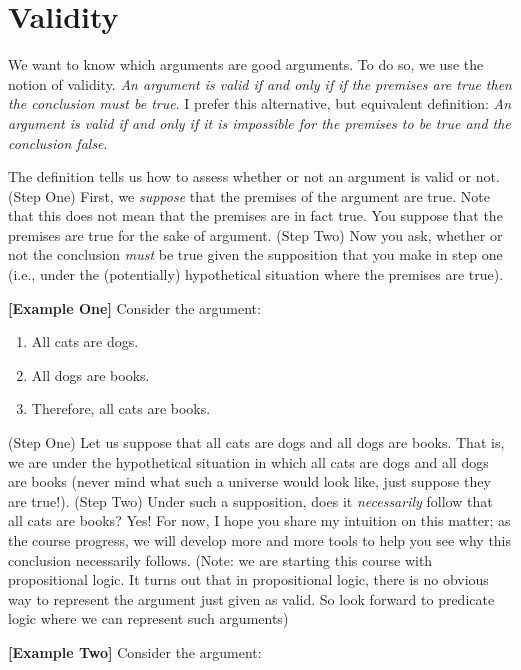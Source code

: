 \documentclass[
]{book}
\providecommand{\tightlist}{%
  \setlength{\itemsep}{0pt}\setlength{\parskip}{0pt}}
\begin{document}
\hypertarget{validity}{%
\section{Validity}\label{validity}}

We want to know which arguments are good arguments. To do so, we use the notion of validity. \emph{An argument is valid if and only if if the premises are true then the conclusion must be true}. I prefer this alternative, but equivalent definition: \emph{An argument is valid if and only if it is impossible for the premises to be true and the conclusion false}.

The definition tells us how to assess whether or not an argument is valid or not. (Step One) First, we \emph{suppose} that the premises of the argument are true. Note that this does not mean that the premises are in fact true. You suppose that the premises are true for the sake of argument. (Step Two) Now you ask, whether or not the conclusion \emph{must} be true given the supposition that you make in step one (i.e., under the (potentially) hypothetical situation where the premises are true).

\textbf{{[}Example One{]}} Consider the argument:

\begin{enumerate}
\def\labelenumi{\arabic{enumi}.}
\tightlist
\item
  All cats are dogs.
\item
  All dogs are books.
\item
  Therefore, all cats are books.
\end{enumerate}

(Step One) Let us suppose that all cats are dogs and all dogs are books. That is, we are under the hypothetical situation in which all cats are dogs and all dogs are books (never mind what such a universe would look like, just suppose they are true!). (Step Two) Under such a supposition, does it \emph{necessarily} follow that all cats are books? Yes! For now, I hope you share my intuition on this matter; as the course progress, we will develop more and more tools to help you see why this conclusion necessarily follows. (Note: we are starting this course with propositional logic. It turns out that in propositional logic, there is no obvious way to represent the argument just given as valid. So look forward to predicate logic where we can represent such arguments)

\textbf{{[}Example Two{]}} Consider the argument:
\end{document}
